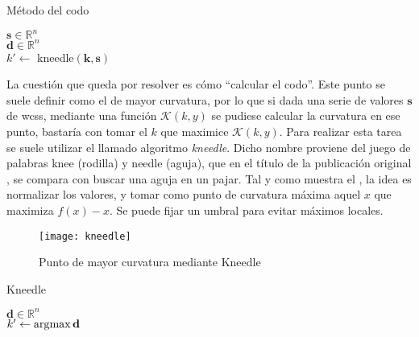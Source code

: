 				\begin{algorithm}[!h]
					\DontPrintSemicolon
					
					\caption{Método del codo}
					\label{algo:codo}
					
					$\textbf{s} \in \mathbb{R}^n$\\
					$\textbf{d} \in \mathbb{R}^n$\\
					$k' \gets$ kneedle$(\textbf{k}, \textbf{s})$
				\end{algorithm}
				
				
				La cuestión que queda por resolver es cómo ``calcular el codo''. Este punto se suele definir como el de mayor curvatura, por lo que si dada una serie de valores $\textbf{s}$ de \gls{wcss}, mediante una función $\mathcal{K}(k, y)$ se pudiese calcular la curvatura en ese punto, bastaría con tomar el $k$ que maximice $\mathcal{K}(k, y)$. Para realizar esta tarea se suele utilizar el llamado algoritmo \textit{kneedle}. Dicho nombre proviene del juego de palabras knee (rodilla) y needle (aguja), que en el título de la publicación original \cite{kneedle}, se compara con buscar una aguja en un pajar. Tal y como muestra el , la idea es normalizar los valores, y tomar como punto de curvatura máxima aquel $x$ que maximiza $f(x) - x$. Se puede fijar un umbral para evitar máximos locales. 
				
				\begin{figure}[!h]
					\centering
					\texttt{[image: kneedle]}
					\caption{Punto de mayor curvatura mediante Kneedle}
					\label{fig:kneedle}
				\end{figure}
				
				\begin{algorithm}
					\DontPrintSemicolon
					
					\caption{Kneedle}
					\label{algo:kneedle}
					
					$\textbf{d} \in \mathbb{R}^n$\\
					$k' \gets \displaystyle\operatorname*{\arg\!\max} \textbf{d}$
				\end{algorithm}